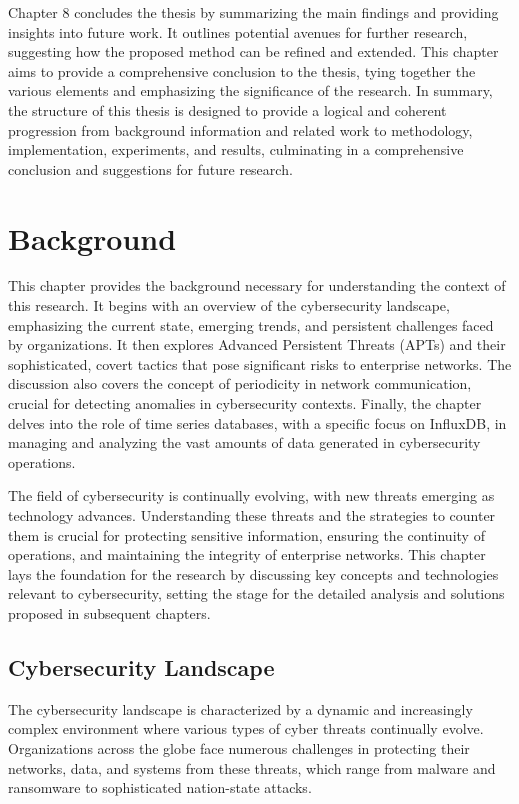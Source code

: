 Chapter 8 concludes the thesis by summarizing the main findings and providing insights into future work. It outlines potential avenues for further research, suggesting how the proposed method can be refined and extended. This chapter aims to provide a comprehensive conclusion to the thesis, tying together the various elements and emphasizing the significance of the research.
In summary, the structure of this thesis is designed to provide a logical and coherent progression from background information and related work to methodology, implementation, experiments, and results, culminating in a comprehensive conclusion and suggestions for future research.
\chapter{Background}
This chapter provides the  background necessary for understanding the context of this research. It begins with an overview of the cybersecurity landscape, emphasizing the current state, emerging trends, and persistent challenges faced by organizations. It then explores Advanced Persistent Threats (APTs) and their sophisticated, covert tactics that pose significant risks to enterprise networks. The discussion also covers the concept of periodicity in network communication, crucial for detecting anomalies in cybersecurity contexts. Finally, the chapter delves into the role of time series databases, with a specific focus on InfluxDB, in managing and analyzing the vast amounts of data generated in cybersecurity operations.

The field of cybersecurity is continually evolving, with new threats emerging as technology advances. Understanding these threats and the strategies to counter them is crucial for protecting sensitive information, ensuring the continuity of operations, and maintaining the integrity of enterprise networks. This chapter lays the foundation for the research by discussing key concepts and technologies relevant to cybersecurity, setting the stage for the detailed analysis and solutions proposed in subsequent chapters.

\section{Cybersecurity Landscape}

The cybersecurity landscape is characterized by a dynamic and increasingly complex environment where various types of cyber threats continually evolve. Organizations across the globe face numerous challenges in protecting their networks, data, and systems from these threats, which range from malware and ransomware to sophisticated nation-state attacks.

